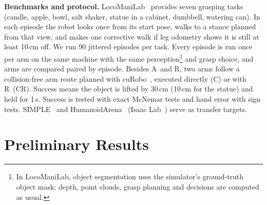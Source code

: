 \documentclass[conference]{IEEEtran}
\newcommand{\Ad}{\textsc{A}}   %
\newcommand{\Rr}{\textsc{R}}   %
\newcommand{\Croute}{\textsc{C}}   %
\newcommand{\CRr}{\textsc{CR}}   %
\begin{document}
\textbf{Benchmarks and protocol.} LocoManiLab~\cite{locomanilab} provides seven grasping tasks (candle, apple, bowl, salt shaker, statue in a cabinet, dumbbell, watering can). In each episode the robot looks once from its start pose, walks to a stance planned from that view, and makes one corrective walk if leg odometry shows it is still at least 10\,cm off. We run 90 jittered episodes per task. Every episode is run once per arm on the same machine with the same perception\footnote{In LocoManiLab, object segmentation uses the simulator's ground-truth object mask; depth, point clouds, grasp planning and decisions are computed as usual.} and grasp choice, and arms are compared paired by episode. Besides \Ad\ and \Rr, two arms follow a collision-free arm route planned with cuRobo~\cite{curobo}, executed directly (\Croute) or with \Rr\ (\CRr). Success means the object is lifted by 30\,cm (10\,cm for the statue) and held for 1\,s. Success is tested with exact McNemar tests and hand error with sign tests. SIMPLE~\cite{simple} and HumanoidArena~\cite{humanoidarena} (Isaac Lab~\cite{isaaclab}) serve as transfer targets.

\section{Preliminary Results}\label{sec:prelim}
\end{document}
